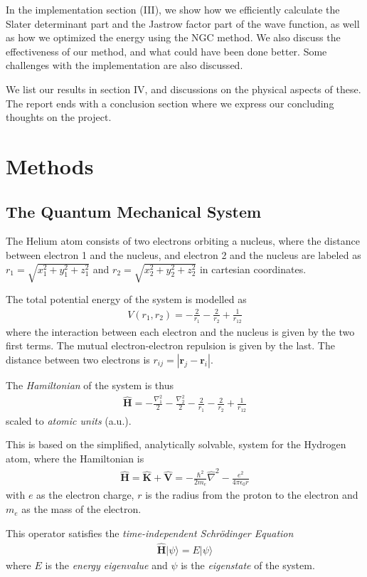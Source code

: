 \documentclass[twocolumns, a4paper,11pt,fleqn]{extarticle}
\newcommand{\eq}[1]{{\small\begin{align*}#1\end{align*}}}
\newcommand{\equ}[1]{{\small\begin{align}#1\end{align}}}
\newcommand{\ket}[1]{|#1\rangle}
\renewcommand\vec[1]{\boldsymbol{\mathbf{#1}}}
\newcommand{\OP}[1]{\mathbf{\widehat{#1}}}
\newcommand{\op}[1]{\hat{#1}}
\begin{document}
In the implementation section (III), we show how we efficiently calculate the
Slater determinant part and the Jastrow factor part of the wave function,
as well as how we optimized the energy using the NGC method.
We also discuss the effectiveness of our method, and what could have been done better.
Some challenges with the implementation are also discussed.

We list our results in section IV, and discussions on the physical aspects of these.
The report ends with a conclusion section where we express our concluding thoughts
on the project.\vspace{5em}

\section{Methods}
\subsection{The Quantum Mechanical System}
The Helium atom consists of two electrons orbiting a nucleus,
where the distance between electron 1 and the nucleus,
and electron 2 and the nucleus are labeled as
$r_1 = \sqrt{x_1^2 + y_1^2 + z_1^2}$ 
and $r_2 = \sqrt{x_2^2 + y_2^2 + z_2^2}$ in cartesian coordinates.

The total potential energy of the system is modelled as
{\small
\eq{
    V(r_1,r_2)=-\frac{2}{r_1}-\frac{2}{r_2}+\frac{1}{r_{12}}
}}%
where the interaction between each electron and the nucleus
is given by the two first terms. 
The mutual electron-electron repulsion is given by the last.
The distance between two electrons is $r_{ij}=|\vec r_j-\vec r_i|$.

The \textit{Hamiltonian} of the system is thus
\eq{
    \OP H = -\frac{\nabla_1 ^2}{2} -\frac{\nabla_2 ^2}{2}
    -\frac{2}{r_1}-\frac{2}{r_2}+\frac{1}{r_{12}}
}
scaled to \textit{atomic units} (a.u.).

This is based on the simplified, analytically solvable, system for the 
Hydrogen atom, where the Hamiltonian is
\equ{
  \OP H = \OP K + \OP V = -\frac{\hbar^2}{2m_e}\op \nabla^2 
  - \frac{e^2}{4\pi \epsilon_0 r} \label{eq:hydro}
}
with $e$ as the electron charge, $r$ is the radius from the proton to the electron
and $m_e$ as the mass of the electron.

This operator satisfies the \textit{time-independent Schr\"odinger Equation}
\equ{
  \OP H \ket{\psi} = E \ket{\psi}\label{eq:schrod}
}
where $E$ is the \textit{energy eigenvalue} and $\psi$ is the \textit{eigenstate} of the system.
\end{document}
